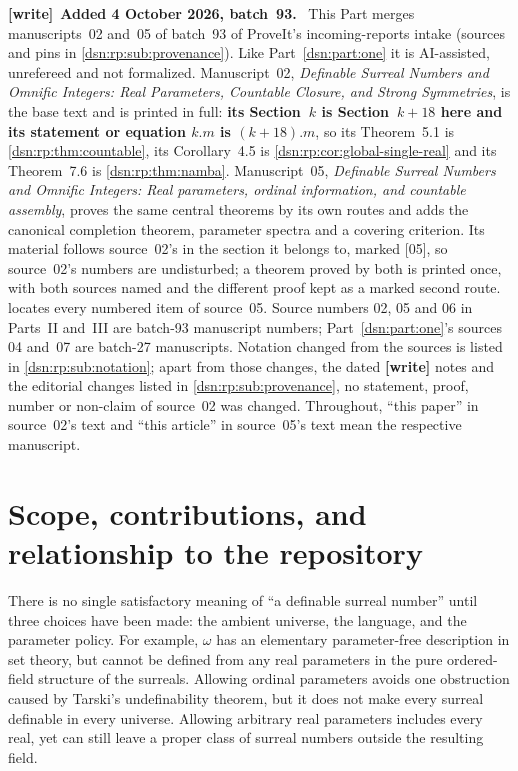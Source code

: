 \documentclass[11pt,a4paper]{article}
\numberwithin{equation}{section}
\theoremstyle{definition}
\theoremstyle{remark}
\newcommand{\src}[1]{\textup{\textsf{\small[#1]}}}
\newenvironment{writenote}[1][]{\par\medskip\begingroup\small\noindent\textbf{[write]}\if\relax\detokenize{#1}\relax\else~\textbf{#1.}\fi~\ignorespaces}{\par\endgroup\medskip}
\begin{document}
\begin{writenote}[Added 4 October 2026, batch~93]
This Part merges manuscripts~02 and~05 of batch~93 of ProveIt's
incoming-reports intake (sources and pins in
\cref{dsn:rp:sub:provenance}). Like Part~\ref{dsn:part:one} it is
AI-assisted, unrefereed and not formalized. Manuscript~02, \emph{Definable
Surreal Numbers and Omnific Integers: Real Parameters, Countable Closure, and
Strong Symmetries}, is the base text and is printed in full: \textbf{its
Section~$k$ is Section~$k+18$ here and its statement or equation $k.m$ is
$(k+18).m$}, so its Theorem~5.1 is \cref{dsn:rp:thm:countable}, its
Corollary~4.5 is \cref{dsn:rp:cor:global-single-real} and its Theorem~7.6 is
\cref{dsn:rp:thm:namba}. Manuscript~05, \emph{Definable Surreal Numbers and
Omnific Integers: Real parameters, ordinal information, and countable
assembly}, proves the same central theorems by its own routes and adds the
canonical completion theorem, parameter spectra and a covering criterion.
Its material follows source~02's in the section it belongs to, marked
\src{05}, so source~02's numbers are undisturbed; a theorem proved by both is
printed once, with both sources named and the different proof kept as a
marked second route.  locates every numbered item of
source~05. Source numbers 02, 05 and 06 in Parts~II and~III are batch-93
manuscript numbers; Part~\ref{dsn:part:one}'s sources 04 and~07 are batch-27
manuscripts. Notation changed from the sources is listed in
\cref{dsn:rp:sub:notation}; apart from those changes, the dated
\textbf{[write]} notes and the editorial changes listed in
\cref{dsn:rp:sub:provenance}, no statement, proof, number or non-claim of
source~02 was changed. Throughout, ``this paper'' in source~02's text and
``this article'' in source~05's text mean the respective manuscript.
\end{writenote}

\section{Scope, contributions, and relationship to the repository}
\label{dsn:rp:sec:scope}

There is no single satisfactory meaning of ``a definable surreal number''
until three choices have been made: the ambient universe, the language,
and the parameter policy. For example, $\omega$ has an elementary
parameter-free description in set theory, but cannot be defined from any
real parameters in the pure ordered-field structure of the surreals.
Allowing ordinal parameters avoids one obstruction caused by Tarski's
undefinability theorem, but it does not make every surreal definable in
every universe. Allowing arbitrary real parameters includes every real,
yet can still leave a proper class of surreal numbers outside the
resulting field.
\end{document}
